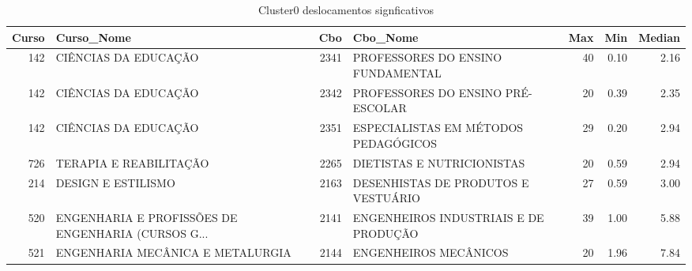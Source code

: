 \begin{table}
\centering
\caption{Cluster0 deslocamentos signficativos }
\label{tab:Salarios_Cluster0}
\begin{tabular}{rlrlrrr}
\toprule
 Curso &                                         Curso\_Nome &  Cbo &                              Cbo\_Nome &  Max &  Min &  Median \\
\midrule
   142 &                               CIÊNCIAS DA EDUCAÇÃO & 2341 &     PROFESSORES DO ENSINO FUNDAMENTAL &   40 & 0.10 &    2.16 \\
   142 &                               CIÊNCIAS DA EDUCAÇÃO & 2342 &     PROFESSORES DO ENSINO PRÉ-ESCOLAR &   20 & 0.39 &    2.35 \\
   142 &                               CIÊNCIAS DA EDUCAÇÃO & 2351 &  ESPECIALISTAS EM MÉTODOS PEDAGÓGICOS &   29 & 0.20 &    2.94 \\
   726 &                             TERAPIA E REABILITAÇÃO & 2265 &            DIETISTAS E NUTRICIONISTAS &   20 & 0.59 &    2.94 \\
   214 &                                 DESIGN E ESTILISMO & 2163 &  DESENHISTAS DE PRODUTOS E  VESTUÁRIO &   27 & 0.59 &    3.00 \\
   520 & ENGENHARIA E PROFISSÕES DE ENGENHARIA (CURSOS G... & 2141 & ENGENHEIROS INDUSTRIAIS E DE PRODUÇÃO &   39 & 1.00 &    5.88 \\
   521 &                   ENGENHARIA MECÂNICA E METALURGIA & 2144 &                 ENGENHEIROS MECÂNICOS &   20 & 1.96 &    7.84 \\
\bottomrule
\end{tabular}
\end{table}
